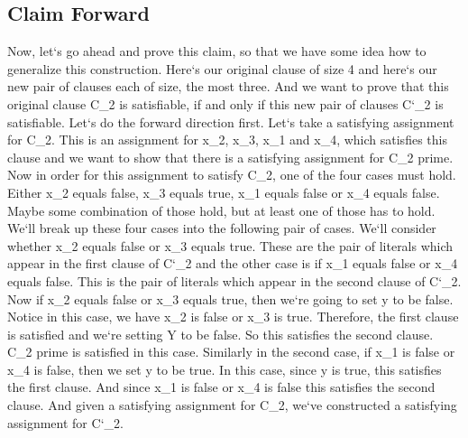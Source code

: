 \subsection{Claim  Forward}
Now, let`s go ahead and prove this claim, so that we have some idea how to generalize this construction.
Here`s our original clause of size 4 and here`s our new pair of clauses each of size, the most three.
And we want to prove that this original clause C\_2 is satisfiable, if and only if this new pair of clauses C`\_2 is satisfiable.
Let`s do the forward direction first.
Let`s take a satisfying assignment for C\_2.
This is an assignment for x\_2, x\_3, x\_1 and x\_4, which satisfies this clause and we want to show that there is a satisfying assignment for C\_2 prime.
Now in order for this assignment to satisfy C\_2, one of the four cases must hold.
Either x\_2 equals false, x\_3 equals true, x\_1 equals false or x\_4 equals false.
Maybe some combination of those hold, but at least one of those has to hold.
We`ll break up these four cases into the following pair of cases.
We`ll consider whether x\_2 equals false or x\_3 equals true.
These are the pair of literals which appear in the first clause of C`\_2 and the other case is if x\_1 equals false or x\_4 equals false.
This is the pair of literals which appear in the second clause of C`\_2.
Now if x\_2 equals false or x\_3 equals true, then we`re going to set y to be false.
Notice in this case, we have x\_2 is false or x\_3 is true.
Therefore, the first clause is satisfied and we`re setting Y to be false.
So this satisfies the second clause.
C\_2 prime is satisfied in this case.
Similarly in the second case, if x\_1 is false or x\_4 is false, then we set y to be true.
In this case, since y is true, this satisfies the first clause.
And since x\_1 is false or x\_4 is false this satisfies the second clause.
And given a satisfying assignment for C\_2, we`ve constructed a satisfying assignment for C`\_2.

